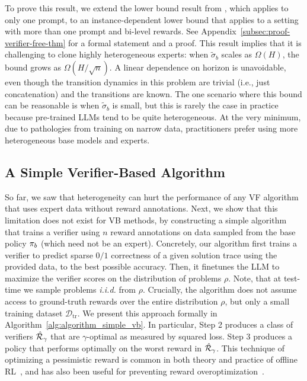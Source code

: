 To prove this result, {we extend the lower bound result from \citet{foster2024behavior}, which applies to only one prompt, to an instance-dependent lower bound that applies to a setting with more than one prompt and bi-level rewards. See Appendix~\ref{subsec:proof-verifier-free-thm} for a formal statement and a proof.} This result implies that it is challenging to clone highly heterogeneous experts: when $\widetilde{\sigma}_b$ scales as $\Omega(H)$, the bound grows as $\Omega(H/\sqrt{n})$. A linear dependence on horizon is unavoidable, even though the transition dynamics in this problem are trivial (i.e., just concatenation) and the transitions are known. The one scenario where this bound can be reasonable is when $\widetilde{\sigma}_b$ is small, but this is rarely the case in practice because pre-trained LLMs tend to be quite heterogeneous. At the very minimum, due to pathologies from training on narrow data, practitioners prefer using more heterogeneous base models and experts. 










\vspace{-0.3cm}
\subsection{A Simple Verifier-Based Algorithm}
\label{subsec:verifier-based}
\vspace{-0.1cm}
So far, we saw that heterogeneity can hurt the performance of any VF algorithm that uses expert data without reward annotations. Next, we show that this limitation does not exist for VB methods, by constructing a simple algorithm that trains a verifier using $n$ reward annotations on data sampled from the base policy $\pi_b$ (which need not be an expert). Concretely, our algorithm first trains a verifier to predict sparse $0/1$ correctness of a given solution trace using the provided data, to the best possible accuracy. Then, it finetunes the LLM to maximize the verifier scores on the distribution of problems $\rho$. Note, that at test-time we sample problems \textit{i.i.d.} from $\rho$. Crucially, the algorithm does not assume access to ground-truth rewards over the entire distribution $\rho$, but only a small training dataset $\mathcal{D}_\mathrm{tr}$.
We present this approach formally in  Algorithm~\ref{alg:algorithm_simple_vb}. In particular,
Step 2 produces a class of verifiers $\hat{{\mathcal{R}}}_\gamma$ that are $\gamma$-optimal as measured by squared loss. Step 3 produces a policy that performs optimally on the worst reward in $\hat{{\mathcal{R}}}_\gamma$. This technique of optimizing a pessimistic reward is common in both theory and practice of offline RL~\citep{wang2024model}, and has also been useful for preventing reward overoptimization~\citep{coste2024reward}.


